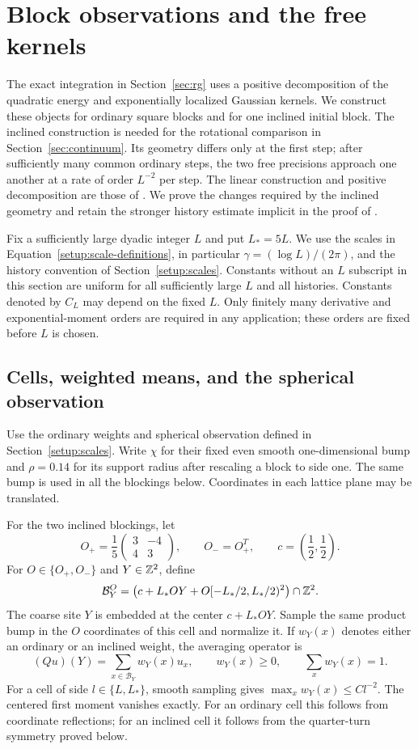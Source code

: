 \section{Block observations and the free kernels}
\label{sec:free}

The exact integration in Section~\ref{sec:rg} uses a positive decomposition
of the quadratic energy and exponentially localized Gaussian kernels.
We construct these objects for ordinary square blocks and for one inclined
initial block.  The inclined construction is needed for the rotational
comparison in Section~\ref{sec:continuum}.  Its geometry differs only at the
first step; after sufficiently many common ordinary steps, the two free
precisions approach one another at a rate of order $L^{-2}$ per step.
The linear construction and positive decomposition are those of
.  We prove the changes required by the inclined geometry
and retain the stronger history estimate implicit in the proof of
.

Fix a sufficiently large dyadic integer $L$ and put $L_*=5L$.
We use the scales in Equation~\eqref{setup:scale-definitions}, in
particular $\gamma=(\log L)/(2\pi)$, and the history convention of
Section~\ref{setup:scales}.  Constants without an $L$ subscript
in this section are uniform for all sufficiently large $L$ and all
histories.  Constants denoted by $C_L$ may depend on the fixed $L$.
Only finitely many derivative and exponential-moment orders are required
in any application; these orders are fixed before $L$ is chosen.

\subsection{Cells, weighted means, and the spherical observation}

Use the ordinary weights and spherical observation defined in
Section~\ref{setup:scales}.  Write $\chi$ for their fixed even smooth
one-dimensional bump and $\rho=0.14$ for its support radius after
rescaling a block to side one.  The same bump is used in all the
blockings below.  Coordinates in each lattice plane may be translated.

For the two inclined blockings, let
\[
 O_+=\frac15\begin{pmatrix}3&-4\\4&3\end{pmatrix},
 \qquad O_-=O_+^T,
 \qquad c=\left(\frac12,\frac12\right).
\]
For $O\in\{O_+,O_-\}$ and $Y\in\mathbb Z^2$, define
\[
 \mathcal B_Y^O
 =\left(c+L_*OY+O[-L_*/2,L_*/2)^2\right)\cap\mathbb Z^2.
\]
The coarse site $Y$ is embedded at the center $c+L_*OY$.
Sample the same product bump in the $O$ coordinates of this cell and
normalize it.  If $w_Y(x)$ denotes either an ordinary or an inclined
weight, the averaging operator is
\[
 (Qu)(Y)=\sum_{x\in\mathcal B_Y}w_Y(x)u_x,
 \qquad w_Y(x)\ge0,\qquad \sum_xw_Y(x)=1.
\]
For a cell of side $l\in\{L,L_*\}$, smooth sampling gives
$\max_xw_Y(x)\le C l^{-2}$.  The centered first moment vanishes exactly.
For an ordinary cell this follows from coordinate reflections; for an
inclined cell it follows from the quarter-turn symmetry proved below.

